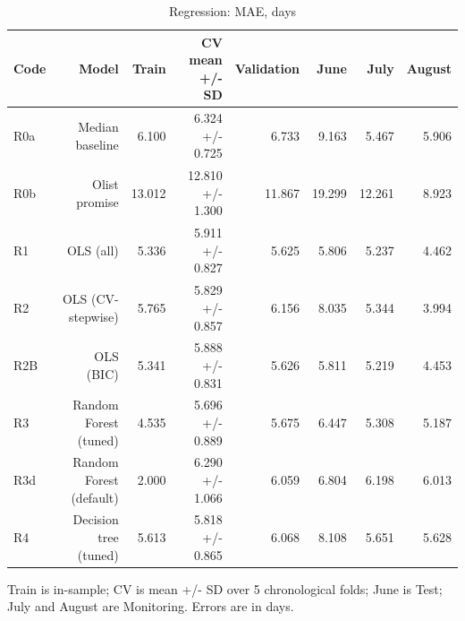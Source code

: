 \begin{table}[htbp]
\centering
\small
\caption{Regression: MAE, days}
\begin{tabular}{lrrrrrrr}
\toprule
Code & Model & Train & CV mean +/- SD & Validation & June & July & August \\
\midrule
R0a & Median baseline & 6.100 & 6.324 +/- 0.725 & 6.733 & 9.163 & 5.467 & 5.906 \\
R0b & Olist promise & 13.012 & 12.810 +/- 1.300 & 11.867 & 19.299 & 12.261 & 8.923 \\
R1 & OLS (all) & 5.336 & 5.911 +/- 0.827 & 5.625 & 5.806 & 5.237 & 4.462 \\
R2 & OLS (CV-stepwise) & 5.765 & 5.829 +/- 0.857 & 6.156 & 8.035 & 5.344 & 3.994 \\
R2B & OLS (BIC) & 5.341 & 5.888 +/- 0.831 & 5.626 & 5.811 & 5.219 & 4.453 \\
R3 & Random Forest (tuned) & 4.535 & 5.696 +/- 0.889 & 5.675 & 6.447 & 5.308 & 5.187 \\
R3d & Random Forest (default) & 2.000 & 6.290 +/- 1.066 & 6.059 & 6.804 & 6.198 & 6.013 \\
R4 & Decision tree (tuned) & 5.613 & 5.818 +/- 0.865 & 6.068 & 8.108 & 5.651 & 5.628 \\
\bottomrule
\end{tabular}
\par\smallskip\begin{minipage}{\linewidth}\footnotesize Train is in-sample; CV is mean +/- SD over 5 chronological folds; June is Test; July and August are Monitoring. Errors are in days.\end{minipage}
\end{table}


